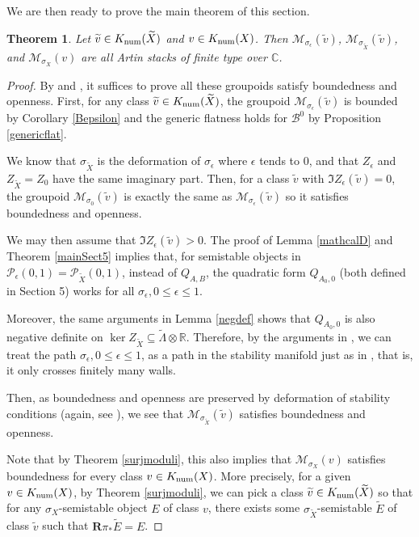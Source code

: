 \documentclass[12pt]{amsart}
\newtheorem{theorem}{Theorem}[section]
\theoremstyle{definition}
\DeclareMathOperator{\num}{num}
\begin{document}
We are then ready to prove the main theorem of this section.
\begin{theorem}\label{Final}
Let $\widetilde{v} \in {\rm K}_{\num}(\widetilde{X})$ and $v \in {\rm K}_{\num}(X)$. Then $\mathcal{M}_{\sigma_\epsilon}(\widetilde{v})$, $\mathcal{M}_{\sigma_{\widetilde{X}}}(\widetilde{v})$, and $\mathcal{M}_{\sigma_X}(v)$ are all Artin stacks of finite type over $\mathbb{C}$.
\end{theorem}
\begin{proof}
By \cite[Theorem 4.2.1]{Lie06} and \cite[Lemma 3.4]{Tod08}, it suffices to prove all these groupoids satisfy boundedness and openness.
First, for any class $\widetilde{v} \in {\rm K}_{\num}(\widetilde{X})$,
the groupoid $\mathcal{M}_{\sigma_\epsilon}(\widetilde{v})$ is bounded by Corollary \ref{Bepsilon} and the generic flatness holds for $\mathcal{B}^0$ by Proposition \ref{genericflat}.


We know that $\sigma_{\widetilde{X}}$ is the deformation of $\sigma_\epsilon$ where $\epsilon$ tends to $0$,
and that $Z_\epsilon$ and $Z_{\widetilde{X}}=Z_0$ have the same imaginary part.
Then, for a class $\widetilde{v}$ with $\Im Z_\epsilon(\widetilde{v})=0$, the groupoid $\mathcal{M}_{\sigma_0}(\widetilde{v})$ is exactly the same as $\mathcal{M}_{\sigma_\epsilon}(\widetilde{v})$ so it satisfies boundedness and openness.

We may then assume that $\Im Z_\epsilon(\widetilde{v})>0$.
The proof of Lemma \ref{mathcalD} and Theorem \ref{mainSect5} implies that, for semistable objects in $\mathcal{P}_\epsilon(0,1)=\mathcal{P}_{\widetilde{X}}(0,1)$, instead of $Q_{A,B}$,
the quadratic form $Q_{A_0,0}$ (both defined in Section 5) works for all $\sigma_\epsilon,0 \leq \epsilon \leq 1$.

Moreover, the same arguments in Lemma \ref{negdef} shows that $Q_{A_0,0}$ is also negative definite on $\ker Z_{\widetilde{X}} \subseteq \widetilde{\Lambda}\otimes \mathbb{R}$.
Therefore, by the arguments in \cite[Sect. 5]{Bay19}, we can treat the path $\sigma_\epsilon,0\leq \epsilon \leq 1$,
as a path in the stability manifold just as in \cite{Bay19},
that is, it only crosses finitely many walls.

Then, as boundedness and openness are preserved by deformation of stability conditions (again, see \cite[Theorem 22.2]{BLM+}),
we see that $\mathcal{M}_{\sigma_{\widetilde{X}}}(\widetilde{v})$ satisfies boundedness and openness.

Note that by Theorem \ref{surjmoduli}, this also implies that  $\mathcal{M}_{\sigma_X}(v)$ satisfies boundedness for every class $v\in {\rm K}_{\num}(X)$.
More precisely, for a given $v \in {\rm K}_{\num}(X)$, by Theorem \ref{surjmoduli},
we can pick a class $\widetilde{v} \in {\rm K}_{\num}(\widetilde{X})$ so that for any $\sigma_X$-semistable object $E$ of class $v$,
there exists some $\sigma_{\widetilde{X}}$-semistable $\widetilde{E}$ of class $\widetilde{v}$ such that $\mathbf{R}\pi_\ast\widetilde{E}=E$.


\end{proof}
\end{document}
